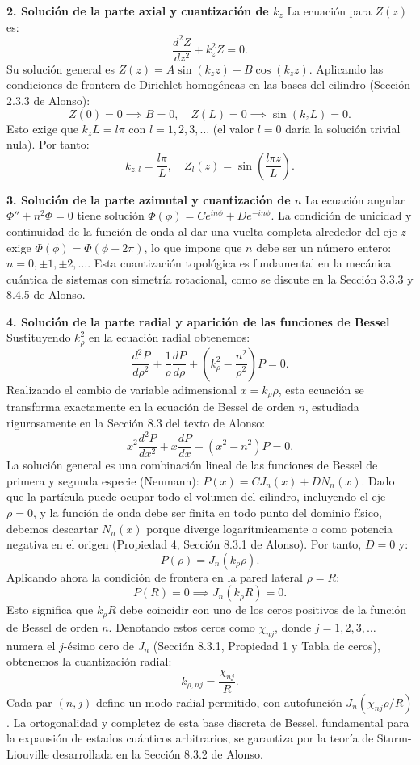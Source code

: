 \documentclass[a4paper]{article}
\begin{document}
\textbf{2. Solución de la parte axial y cuantización de $k_z$}
La ecuación para $Z(z)$ es:
$$\frac{d^2Z}{dz^2} + k_z^2 Z = 0.$$
Su solución general es $Z(z) = A\sin(k_z z) + B\cos(k_z z)$. Aplicando las condiciones de frontera de Dirichlet homogéneas en las bases del cilindro (Sección 2.3.3 de Alonso):
$$Z(0) = 0 \implies B = 0, \quad Z(L) = 0 \implies \sin(k_z L) = 0.$$
Esto exige que $k_z L = l\pi$ con $l = 1, 2, 3, \dots$ (el valor $l=0$ daría la solución trivial nula). Por tanto:
$$k_{z,l} = \frac{l\pi}{L}, \quad Z_l(z) = \sin\left(\frac{l\pi z}{L}\right).$$

\textbf{3. Solución de la parte azimutal y cuantización de $n$}
La ecuación angular $\Phi'' + n^2\Phi = 0$ tiene solución $\Phi(\phi) = C e^{in\phi} + D e^{-in\phi}$. La condición de unicidad y continuidad de la función de onda al dar una vuelta completa alrededor del eje $z$ exige $\Phi(\phi) = \Phi(\phi+2\pi)$, lo que impone que $n$ debe ser un número entero: $n = 0, \pm 1, \pm 2, \dots$. Esta cuantización topológica es fundamental en la mecánica cuántica de sistemas con simetría rotacional, como se discute en la Sección 3.3.3 y 8.4.5 de Alonso.

\textbf{4. Solución de la parte radial y aparición de las funciones de Bessel}
Sustituyendo $k_\rho^2$ en la ecuación radial obtenemos:
$$\frac{d^2P}{d\rho^2} + \frac{1}{\rho}\frac{dP}{d\rho} + \left(k_\rho^2 - \frac{n^2}{\rho^2}\right)P = 0.$$
Realizando el cambio de variable adimensional $x = k_\rho\rho$, esta ecuación se transforma exactamente en la ecuación de Bessel de orden $n$, estudiada rigurosamente en la Sección 8.3 del texto de Alonso:
$$x^2\frac{d^2P}{dx^2} + x\frac{dP}{dx} + (x^2 - n^2)P = 0.$$
La solución general es una combinación lineal de las funciones de Bessel de primera y segunda especie (Neumann): $P(x) = C J_n(x) + D N_n(x)$. Dado que la partícula puede ocupar todo el volumen del cilindro, incluyendo el eje $\rho=0$, y la función de onda debe ser finita en todo punto del dominio físico, debemos descartar $N_n(x)$ porque diverge logarítmicamente o como potencia negativa en el origen (Propiedad 4, Sección 8.3.1 de Alonso). Por tanto, $D=0$ y:
$$P(\rho) = J_n(k_\rho\rho).$$
Aplicando ahora la condición de frontera en la pared lateral $\rho = R$:
$$P(R) = 0 \implies J_n(k_\rho R) = 0.$$
Esto significa que $k_\rho R$ debe coincidir con uno de los ceros positivos de la función de Bessel de orden $n$. Denotando estos ceros como $\chi_{nj}$, donde $j=1,2,3,\dots$ numera el $j$-ésimo cero de $J_n$ (Sección 8.3.1, Propiedad 1 y Tabla de ceros), obtenemos la cuantización radial:
$$k_{\rho,nj} = \frac{\chi_{nj}}{R}.$$
Cada par $(n,j)$ define un modo radial permitido, con autofunción $J_n(\chi_{nj}\rho/R)$. La ortogonalidad y completez de esta base discreta de Bessel, fundamental para la expansión de estados cuánticos arbitrarios, se garantiza por la teoría de Sturm-Liouville desarrollada en la Sección 8.3.2 de Alonso.
\end{document}

